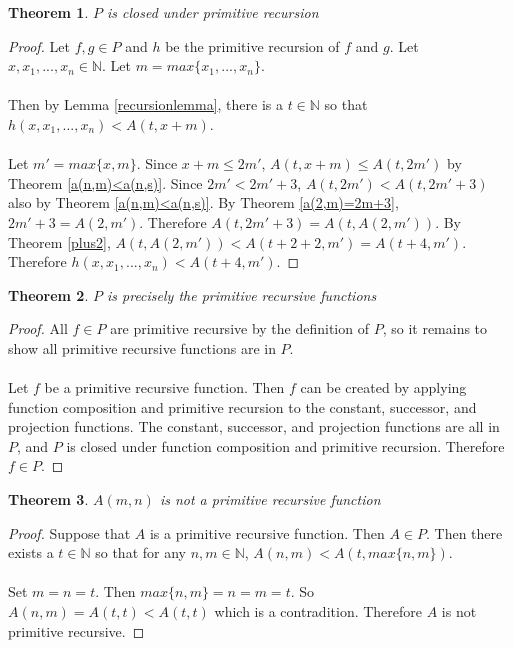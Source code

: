 \documentclass[12pt, letterpaper]{article}
\newtheorem{theorem}{Theorem}
\theoremstyle{case}
\begin{document}
    \begin{theorem}
      $P$ is closed under primitive recursion
    \end{theorem}
    \begin{proof}
      Let $f, g \in P$ and $h$ be the primitive recursion of $f$ and $g$.
      Let $x, x_1, ..., x_n \in \mathbb{N}$.
      Let $m = max\{x_1, ..., x_n\}$.
      \\
      \\
      Then by Lemma \ref{recursionlemma}, there is a $t \in \mathbb{N}$ so that
      $h(x, x_1, ..., x_n) < A(t, x + m)$.
      \\
      \\
      Let $m' = max\{x, m\}$.
      Since $x + m \leq 2m'$, $A(t, x + m) \leq A(t, 2m')$ by Theorem \ref{a(n,m)<a(n,s)}.
      Since $2m' < 2m' + 3$, $A(t, 2m') < A(t, 2m' + 3)$ also by Theorem \ref{a(n,m)<a(n,s)}.
      By Theorem \ref{a(2,m)=2m+3}, $2m' + 3 = A(2, m')$.
      Therefore $A(t, 2m' + 3) = A(t, A(2, m'))$.
      By Theorem \ref{plus2}, $A(t, A(2, m')) < A(t + 2 + 2, m') = A(t + 4, m')$.
      Therefore $h(x, x_1, ..., x_n) < A(t + 4, m')$.
    \end{proof}

    \begin{theorem}
      $P$ is precisely the primitive recursive functions
    \end{theorem}
    \begin{proof}
      All $f \in P$ are primitive recursive by the definition of $P$,
      so it remains to show all primitive recursive functions are in $P$.
      \\
      \\
      Let $f$ be a primitive recursive function.
      Then $f$ can be created by applying function composition and primitive recursion to the constant, successor, and
      projection functions. The constant, successor, and projection functions are all in $P$, and $P$ is closed under
      function composition and primitive recursion. Therefore $f \in P$.
    \end{proof}

    \begin{theorem}
      $A(m, n)$ is not a primitive recursive function
    \end{theorem}
    \begin{proof}
      Suppose that $A$ is a primitive recursive function. Then $A \in P$. Then there exists a $t \in \mathbb{N}$
      so that for any $n, m \in \mathbb{N}$, $A(n, m) < A(t, max\{n, m\})$.
      \\
      \\
      Set $m = n = t$. Then $max\{n, m\} = n = m = t$. So $A(n, m) = A(t, t) < A(t, t)$ which is a contradition.
      Therefore $A$ is not primitive recursive.
    \end{proof}
\end{document}
